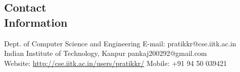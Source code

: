 \documentclass[margin,line]{resume}
\begin{document}
\begin{resume}

  \section{\mysidestyle Contact\\Information}

  Dept. of Computer Science and Engineering                            \hfill E-mail: pratikkr@cse.iitk.ac.in  \vspace{0mm}\\\vspace{0mm}%
  Indian Institute of Technology, Kanpur                               \hfill pankaj200292@gmail.com  \vspace{0mm}\\\vspace{0mm}%
  Website: \url{http://cse.iitk.ac.in/users/pratikkr/}                                                                      \hfill Mobile: +91 94 50 039421 \vspace{0mm}\       \vspace{0mm}\\\vspace{-4.5mm}%






\end{resume}
\end{document}
